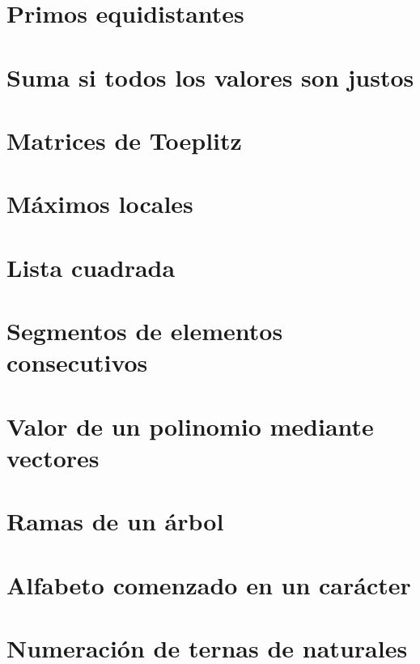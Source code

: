 \documentclass[a4paper,12pt,twoside]{book}
\begin{document}
\chapter{Primos equidistantes}

\chapter{Suma si todos los valores son justos}

\chapter{Matrices de Toeplitz}

\chapter{Máximos locales}

\chapter{Lista cuadrada}

\chapter{Segmentos de elementos consecutivos}

\chapter{Valor de un polinomio mediante vectores}

\chapter{Ramas de un árbol}


\chapter{Alfabeto comenzado en un carácter}

\chapter{Numeración de ternas de naturales}
\end{document}
